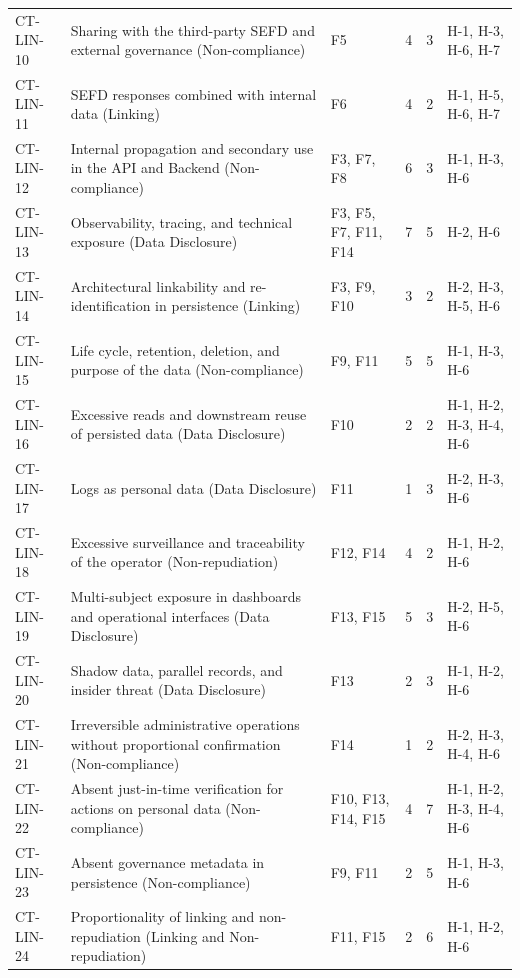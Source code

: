\begin{longtable}{l p{} p{} c c p{}}
        CT-LIN-10 & Sharing with the third-party SEFD and external governance (Non-compliance) & F5 & 4 & 3 & H-1, H-3, H-6, H-7 \\[0.4em]
        CT-LIN-11 & SEFD responses combined with internal data (Linking) & F6 & 4 & 2 & H-1, H-5, H-6, H-7 \\[0.4em]
        CT-LIN-12 & Internal propagation and secondary use in the API and Backend (Non-compliance) & F3, F7, F8 & 6 & 3 & H-1, H-3, H-6 \\[0.4em]
        CT-LIN-13 & Observability, tracing, and technical exposure (Data Disclosure) & F3, F5, F7, F11, F14 & 7 & 5 & H-2, H-6 \\[0.4em]
        CT-LIN-14 & Architectural linkability and re-identification in persistence (Linking) & F3, F9, F10 & 3 & 2 & H-2, H-3, H-5, H-6 \\[0.4em]
        CT-LIN-15 & Life cycle, retention, deletion, and purpose of the data (Non-compliance) & F9, F11 & 5 & 5 & H-1, H-3, H-6 \\[0.4em]
        CT-LIN-16 & Excessive reads and downstream reuse of persisted data (Data Disclosure) & F10 & 2 & 2 & H-1, H-2, H-3, H-4, H-6 \\[0.4em]
        CT-LIN-17 & Logs as personal data (Data Disclosure) & F11 & 1 & 3 & H-2, H-3, H-6 \\[0.4em]
        CT-LIN-18 & Excessive surveillance and traceability of the operator (Non-repudiation) & F12, F14 & 4 & 2 & H-1, H-2, H-6 \\[0.4em]
        CT-LIN-19 & Multi-subject exposure in dashboards and operational interfaces (Data Disclosure) & F13, F15 & 5 & 3 & H-2, H-5, H-6 \\[0.4em]
        CT-LIN-20 & Shadow data, parallel records, and insider threat (Data Disclosure) & F13 & 2 & 3 & H-1, H-2, H-6 \\[0.4em]
        CT-LIN-21 & Irreversible administrative operations without proportional confirmation (Non-compliance) & F14 & 1 & 2 & H-2, H-3, H-4, H-6 \\[0.4em]
        CT-LIN-22 & Absent just-in-time verification for actions on personal data (Non-compliance) & F10, F13, F14, F15 & 4 & 7 & H-1, H-2, H-3, H-4, H-6 \\[0.4em]
        CT-LIN-23 & Absent governance metadata in persistence (Non-compliance) & F9, F11 & 2 & 5 & H-1, H-3, H-6 \\[0.4em]
        CT-LIN-24 & Proportionality of linking and non-repudiation (Linking and Non-repudiation) & F11, F15 & 2 & 6 & H-1, H-2, H-6 \\
\end{longtable}

